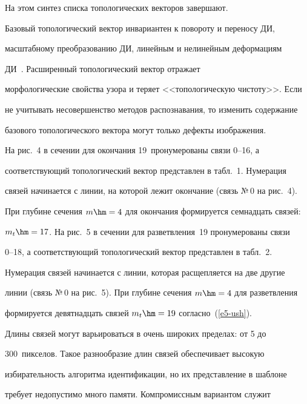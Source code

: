   


  На этом синтез списка топологических векторов завершают.





Базовый топологический вектор инвариантен к повороту и переносу ДИ, 


масштабному преобразованию ДИ, линейным и нелинейным деформациям 


ДИ~\cite{1-ush, 8-ush}. Расширенный топологический вектор отражает 


морфологические свойства узора и теряет <<топологическую чистоту>>. Если 


не учитывать несовершенство методов распознавания, то изменить содержание 


базового топологического вектора могут только дефекты изображения.











  На рис.~4 в сечении для окончания 19~пронумерованы связи 0--16, а 


соответствующий топологический вектор представлен в табл.~1. Нумерация 


связей начинается с линии, на которой лежит окончание (связь №\,0 на рис.~4). 


При глубине сечения $m\hm=4$ для окончания формируется семнадцать связей: 


$m_t\hm=17$. На рис.~5 в сечении для разветвления~19 пронумерованы связи 


0--18, а соответствующий топологический вектор представлен в табл.~2. 


Нумерация связей начинается с линии, которая расщепляется на две другие 


линии (связь №\,0 на рис.~5). При глубине сечения $m\hm=4$ для разветвления 


формируется девятнадцать связей $m_t\hm=19$ согласно~(\ref{e5-ush}).


  


  Длины связей могут варьироваться в очень широких пределах: от 5 до 


300~пикселов. Такое разнообразие длин связей обеспечивает высокую 


избирательность алгоритма идентификации, но их представление в шаблоне 


требует недопустимо много памяти. Компромиссным вариантом служит 


